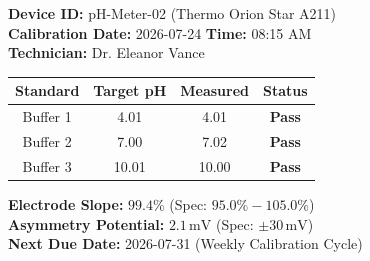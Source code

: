 \documentclass[10pt,a4paper]{article}
\begin{document}
\begin{minipage}[t]{0.485\textwidth}
  \begin{tcolorbox}[labcardteal, title={\small\bfseries\color{white}\faMicroscope\ pH Meter 3-Point Calibration Record}, coltitle=white, colbacktitle=labteal]
    \scriptsize
    \textbf{Device ID:} pH-Meter-02 (Thermo Orion Star A211)\\
    \textbf{Calibration Date:} 2026-07-24 \quad \textbf{Time:} 08:15 AM\\
    \textbf{Technician:} Dr. Eleanor Vance

    \vspace{2pt}
    \begin{tabularx}{\textwidth}{@{}cccc@{}}
      \toprule
      \rowcolor{labbg}
      \textbf{Standard} & \textbf{Target pH} & \textbf{Measured} & \textbf{Status} \\
      \midrule
      Buffer 1 & 4.01 & 4.01 & \color{labgreen}\textbf{Pass} \\
      Buffer 2 & 7.00 & 7.02 & \color{labgreen}\textbf{Pass} \\
      Buffer 3 & 10.01 & 10.00 & \color{labgreen}\textbf{Pass} \\
      \bottomrule
    \end{tabularx}

    \vspace{2pt}
    {\tiny\color{labtext}
    \textbf{Electrode Slope:} $99.4\%$ (Spec: $95.0\% - 105.0\%$)\\
    \textbf{Asymmetry Potential:} $2.1\,\text{mV}$ (Spec: $\pm 30\,\text{mV}$)\\
    \textbf{Next Due Date:} 2026-07-31 (Weekly Calibration Cycle)
    }
  \end{tcolorbox}
\end{minipage}%
\hfill
\end{document}
